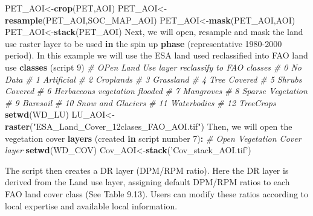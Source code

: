 \documentclass[
  10pt,
  b5paper,
]{book}
\newenvironment{Shaded}{\begin{snugshade}}{\end{snugshade}}
\newcommand{\CommentTok}[1]{\textcolor[rgb]{0.56,0.35,0.01}{\textit{#1}}}
\newcommand{\ControlFlowTok}[1]{\textcolor[rgb]{0.13,0.29,0.53}{\textbf{#1}}}
\newcommand{\DecValTok}[1]{\textcolor[rgb]{0.00,0.00,0.81}{#1}}
\newcommand{\KeywordTok}[1]{\textcolor[rgb]{0.13,0.29,0.53}{\textbf{#1}}}
\newcommand{\NormalTok}[1]{#1}
\newcommand{\OperatorTok}[1]{\textcolor[rgb]{0.81,0.36,0.00}{\textbf{#1}}}
\newcommand{\StringTok}[1]{\textcolor[rgb]{0.31,0.60,0.02}{#1}}
\begin{document}
\begin{Shaded}
\begin{Highlighting}[]
\NormalTok{PET_AOI<-}\KeywordTok{crop}\NormalTok{(PET,AOI)}
\NormalTok{PET_AOI<-}\KeywordTok{resample}\NormalTok{(PET_AOI,SOC_MAP_AOI)}
\NormalTok{PET_AOI<-}\KeywordTok{mask}\NormalTok{(PET_AOI,AOI)}
\NormalTok{PET_AOI<-}\KeywordTok{stack}\NormalTok{(PET_AOI)}
\NormalTok{Next, we will open, resample and mask the land use raster layer to be used }\ControlFlowTok{in}\NormalTok{ the spin up }\KeywordTok{phase}\NormalTok{ (representative }\DecValTok{1980-2000}\NormalTok{ period).  In this example we will use the ESA land used reclassified into FAO land use }\KeywordTok{classes}\NormalTok{ (script }\DecValTok{9}\NormalTok{)}
\CommentTok{# OPen Land Use layer reclassify to FAO classes }
\CommentTok{# 0 No Data}
\CommentTok{# 1 Artificial}
\CommentTok{# 2 Croplands}
\CommentTok{# 3 Grassland}
\CommentTok{# 4 Tree Covered}
\CommentTok{# 5 Shrubs Covered}
\CommentTok{# 6 Herbaceous vegetation flooded}
\CommentTok{# 7 Mangroves}
\CommentTok{# 8 Sparse Vegetation}
\CommentTok{# 9 Baresoil}
\CommentTok{# 10 Snow and Glaciers}
\CommentTok{# 11 Waterbodies}
\CommentTok{# 12 TreeCrops}
\KeywordTok{setwd}\NormalTok{(WD_LU)}
\NormalTok{LU_AOI<-}\KeywordTok{raster}\NormalTok{(}\StringTok{"ESA_Land_Cover_12clases_FAO_AOI.tif"}\NormalTok{)}
\NormalTok{Then, we will open the vegetation cover }\KeywordTok{layers}\NormalTok{ (created }\ControlFlowTok{in}\NormalTok{ script number }\DecValTok{7}\NormalTok{)}\OperatorTok{:}
\CommentTok{# Open Vegetation Cover layer }
\KeywordTok{setwd}\NormalTok{(WD_COV)}
\NormalTok{Cov_AOI<-}\KeywordTok{stack}\NormalTok{(}\StringTok{'Cov_stack_AOI.tif'}\NormalTok{)}
\end{Highlighting}
\end{Shaded}

The script then creates a DR layer (DPM/RPM ratio). Here the DR layer is derived from the Land use layer, assigning default DPM/RPM ratios to each FAO land cover class (See Table 9.13). Users can modify these ratios according to local expertise and available local information.
\end{document}
